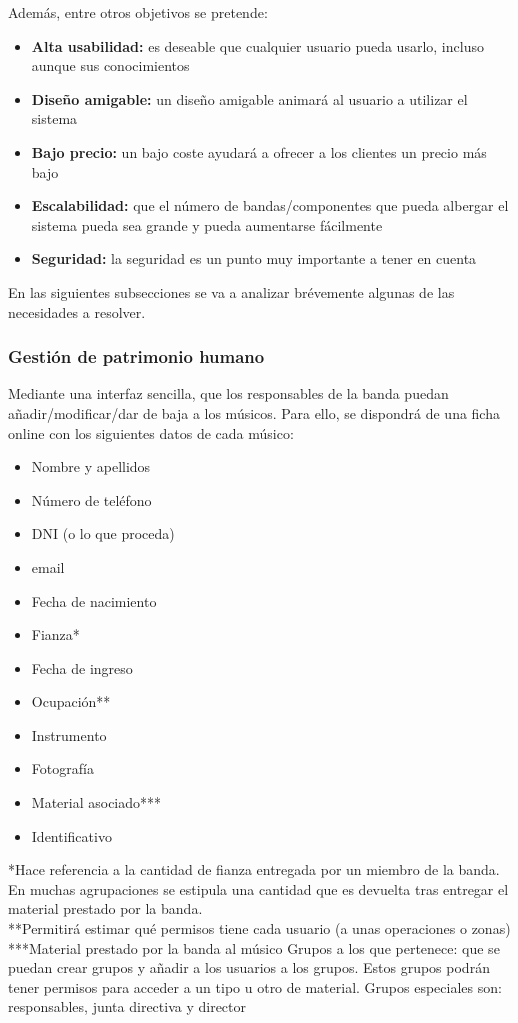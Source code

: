 \documentclass[11pt,spanish]{article}
\begin{document}
\setlength{\parskip}{10pt plus 1pt minus 1pt}

Además, entre otros objetivos se pretende:
\begin{itemize}
  \item \textbf{Alta usabilidad:} es deseable que cualquier usuario pueda usarlo,
    incluso aunque sus conocimientos
  \item \textbf{Diseño amigable:} un diseño amigable animará al usuario a utilizar el sistema
  \item \textbf{Bajo precio:} un bajo coste ayudará a ofrecer a los clientes un precio más bajo
  \item \textbf{Escalabilidad:} que el número de bandas/componentes que pueda albergar el sistema
  pueda sea grande y pueda aumentarse fácilmente
  \item \textbf{Seguridad:} la seguridad es un punto muy importante a tener en cuenta
\end{itemize}


En las siguientes subsecciones se va a analizar brévemente algunas de las necesidades a
resolver.

\subsubsection{Gestión de patrimonio humano}
Mediante una interfaz sencilla, que los responsables de la banda puedan añadir/modificar/dar
de baja a los músicos. Para ello, se dispondrá de una ficha online con los siguientes datos de cada músico:
\begin{itemize}
  \item Nombre y apellidos
  \item Número de teléfono
  \item DNI (o lo que proceda)
  \item email
  \item Fecha de nacimiento
  \item Fianza*
  \item Fecha de ingreso
  \item Ocupación**
  \item Instrumento
  \item Fotografía
  \item Material asociado***
  \item Identificativo
\end{itemize}
\footnotesize{*Hace referencia a la cantidad de fianza entregada por un miembro
de la banda. En muchas agrupaciones se estipula una cantidad que es devuelta tras entregar
el material prestado por la banda.}\\
\footnotesize{**Permitirá estimar qué permisos tiene cada usuario (a unas operaciones
o zonas)}\\
\footnotesize{***Material prestado por la banda al músico}
Grupos a los que pertenece: que se puedan crear grupos y añadir a los usuarios a los grupos. Estos grupos podrán tener permisos para acceder a un tipo u otro de material. Grupos especiales son: responsables, junta directiva y director
\end{document}
